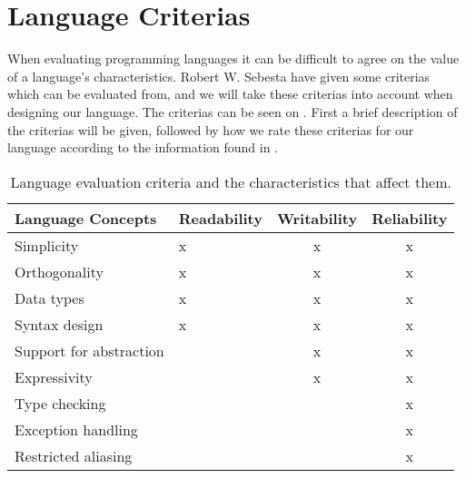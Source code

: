 \chapter{Language Criterias}
When evaluating programming languages it can be difficult to agree on the value of a language's characteristics.
Robert W. Sebesta have given some criterias which can be evaluated from, and we will take these criterias into account when designing our language.\citep{Sebesta}
The criterias can be seen on .
First a brief description of the criterias will be given, followed by how we rate these criterias for our language according to the information found in .
\begin{table}[h]
	\centering
	\begin{tabular}{|l|l|c|c|}
	\hline
	\textbf{Language Concepts}										& \textbf{Readability}  & \textbf{Writability} & \textbf{Reliability}   \\ \hline
	Simplicity                                                  	& x 					& x             		 & x           			\\ \hline
	Orthogonality                                               	& x 					& x             		 & x           			\\ \hline
	Data types                                                  	& x 					& x             		 & x           			\\ \hline
	Syntax design                                               	& x 					& x             		 & x           			\\ \hline
	Support for abstraction                                    		&                       & x             		 & x           			\\ \hline
	Expressivity                                                	&                       & x             		 & x           			\\ \hline
	Type checking                                               	&                       &            			 & x           			\\ \hline
	Exception handling                                          	&                       &             			 & x           			\\ \hline
	Restricted aliasing                                         	&                       &             			 & x           			\\ \hline
	\end{tabular}
	\caption{Language evaluation criteria and the characteristics that affect them.}
	\label{tbl:concepts}
\end{table}


